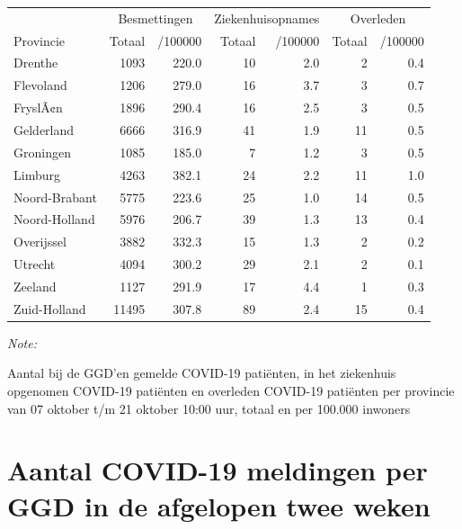 \documentclass[
  english,
  man,floatsintext]{apa6}
\begin{document}
\begin{table}
\centering
\begin{threeparttable}
\begin{tabular}{lrrrrrr}
\toprule
\multicolumn{1}{c}{ } & \multicolumn{2}{c}{Besmettingen} & \multicolumn{2}{c}{Ziekenhuisopnames} & \multicolumn{2}{c}{Overleden} \\
\cmidrule(l{3pt}r{3pt}){2-3} \cmidrule(l{3pt}r{3pt}){4-5} \cmidrule(l{3pt}r{3pt}){6-7}
Provincie & Totaal & /100000 & Totaal & /100000 & Totaal & /100000\\
\midrule
Drenthe & 1093 & 220.0 & 10 & 2.0 & 2 & 0.4\\
Flevoland & 1206 & 279.0 & 16 & 3.7 & 3 & 0.7\\
FryslÃ¢n & 1896 & 290.4 & 16 & 2.5 & 3 & 0.5\\
Gelderland & 6666 & 316.9 & 41 & 1.9 & 11 & 0.5\\
Groningen & 1085 & 185.0 & 7 & 1.2 & 3 & 0.5\\
Limburg & 4263 & 382.1 & 24 & 2.2 & 11 & 1.0\\
Noord-Brabant & 5775 & 223.6 & 25 & 1.0 & 14 & 0.5\\
Noord-Holland & 5976 & 206.7 & 39 & 1.3 & 13 & 0.4\\
Overijssel & 3882 & 332.3 & 15 & 1.3 & 2 & 0.2\\
Utrecht & 4094 & 300.2 & 29 & 2.1 & 2 & 0.1\\
Zeeland & 1127 & 291.9 & 17 & 4.4 & 1 & 0.3\\
Zuid-Holland & 11495 & 307.8 & 89 & 2.4 & 15 & 0.4\\
\bottomrule
\end{tabular}
\begin{tablenotes}
\item \textit{Note: } 
\item Aantal bij de GGD’en gemelde COVID-19 patiënten, in het ziekenhuis opgenomen COVID-19 patiënten en overleden COVID-19 patiënten per provincie van 07 oktober t/m 21 oktober 10:00 uur, totaal en per 100.000 inwoners
\end{tablenotes}
\end{threeparttable}
\end{table}

\newpage

\hypertarget{aantal-covid-19-meldingen-per-ggd-in-de-afgelopen-twee-weken}{%
\section{Aantal COVID-19 meldingen per GGD in de afgelopen twee weken}\label{aantal-covid-19-meldingen-per-ggd-in-de-afgelopen-twee-weken}}
\end{document}
